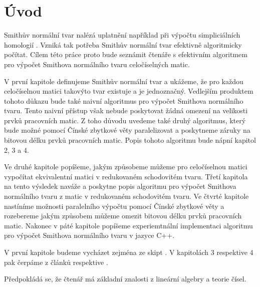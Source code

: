 \chapter*{Úvod}

Smithův normální tvar nalézá uplatnění například při výpočtu simpliciálních
homologií \cite{Simplic_Homo}. Vzniká tak potřeba Smithův normální tvar efektivně
algoritmicky počítat. Cílem této práce proto bude seznámit čtenáře s efektivním
algoritmem pro výpočet Smithova normálního tvaru celočíselných matic.

V první kapitole definujeme Smithův normální tvar a ukážeme, že pro každou
celočíselnou matici takovýto tvar existuje a je jednoznačný. Vedlejším produktem
tohoto důkazu bude také naivní algoritmus pro výpočet Smithova normálního tvaru.
Tento naivní přístup však nebude poskytovat žádná omezení na velikosti prvků
pracovních matic. Z toho důvodu uvedeme také druhý algoritmus, který
bude možné pomocí Čínské zbytkové věty paralelizovat a poskytneme záruky na
bitovou délku prvků pracovních matic. Popis tohoto algoritmu bude nápní kapitol
2, 3 a 4.

Ve druhé kapitole popíšeme, jakým způsobeme můžeme pro celočíselnou matici
vypočítat ekvivalentní matici v redukovaném schodovitém tvaru. Třetí kapitola
na tento výsledek naváže a poskytne popis algoritmu pro výpočet Smithova
normálního tvaru z matic v redukovaném schodovitém tvaru. Ve čtvrté kapitole
nastíníme možnosti paralelního výpočtu pomocí Čínské zbytkové věty a rozebereme
jakým způsobem můžeme omezit bitovou délku prvků pracovních matic.
Nakonec v páté kapitole popíšeme experiemtnální implementaci algoritmu pro
výpočet Smithova normálního tvaru v jazyce C++.

V první kapitole budeme vycházet zejména ze skipt \cite{vokr}. V kapitolách
3 respektive 4 pak čerpáme z článků \cite{triang} respektive \cite{SNF_Arne}.

Předpokládá se, že čtenář má základní znalosti z lineární algebry a teorie čísel.

\cleardoublepage

